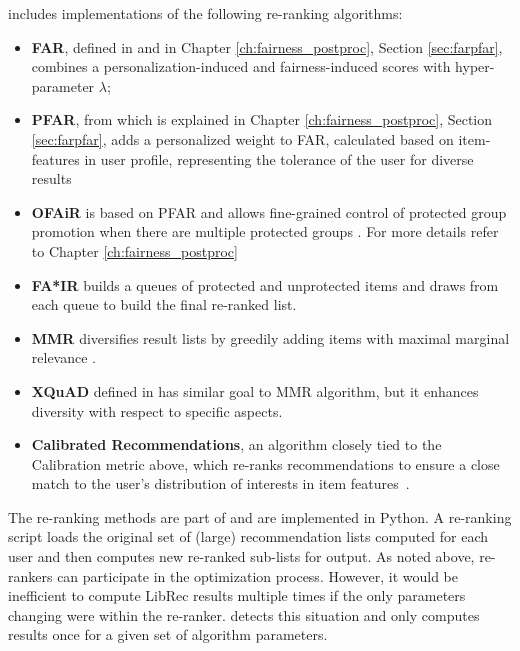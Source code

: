 \libauto{} includes implementations of the following re-ranking algorithms:
\begin{itemize}
    \item \textbf{FAR}, defined in \cite{liu2019farpfar} and in Chapter \ref{ch:fairness_postproc}, Section \ref{sec:farpfar}, combines a personalization-induced and fairness-induced scores with hyper-parameter $\lambda$;
    \item \textbf{PFAR}, from \cite{liu2019farpfar} which is explained in Chapter \ref{ch:fairness_postproc}, Section \ref{sec:farpfar}, adds a personalized weight to FAR, calculated based on item-features in user profile, representing the tolerance of the user for diverse results
    \item \textbf{OFAiR} is based on PFAR and allows fine-grained control of protected group promotion when there are multiple protected groups \cite{sonboli2020opportunistic}. For more details refer to Chapter \ref{ch:fairness_postproc}
    
    \item \textbf{FA*IR} \cite{zehlike2017fa} builds a queues of protected and unprotected items and draws from each queue to build the final re-ranked list.
    \item \textbf{MMR} diversifies result lists by greedily adding items with maximal marginal relevance \cite{carbonell1998use}.
    \item \textbf{XQuAD} defined in \cite{santos2010explicit} has similar goal to MMR algorithm, but it enhances diversity with respect to specific aspects.
    \item \textbf{Calibrated Recommendations}, an algorithm closely tied to the Calibration metric above, which re-ranks recommendations to ensure a close match to the user's distribution of interests in item features~\cite{steck2018calibrated}.
\end{itemize}

The re-ranking methods are part of \libauto{} and are implemented in Python. A re-ranking script loads the original set of (large) recommendation lists computed for each user and then computes new re-ranked sub-lists for output. As noted above, re-rankers can participate in the optimization process. However, it would be inefficient to compute LibRec results multiple times if the only parameters changing were within the re-ranker. \libauto{} detects this situation and only computes results once for a given set of algorithm parameters. 


